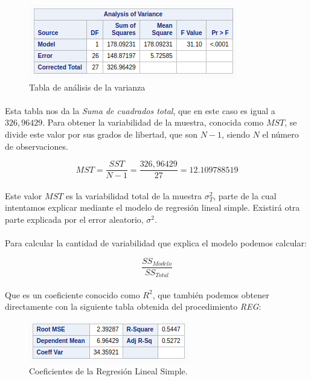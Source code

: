 \documentclass{article}
\begin{document}
  \begin{figure}[H]
    \centering
    \includegraphics[width=.5\linewidth]{img/montgomery/anovatable.png}
    \caption{Tabla de análisis de la varianza}
  \end{figure}

  \paragraph{}
  Esta tabla nos da la \textit{Suma de cuadrados total}, que en este caso es igual a $326,96429$. Para obtener la variabilidad de la muestra, conocida como $MST$, se divide este valor por sus grados de libertad, que son $N-1$, siendo $N$ el número de observaciones.

  \begin{equation}
    MST = \frac{SST}{N-1} = \frac{326,96429}{27} = 12.109788519
  \end{equation}

  \paragraph{}
  Este valor $MST$ es la variabilidad total de la muestra $\sigma_T^2$, parte de la cual intentamos explicar mediante el modelo de regresión lineal simple. Existirá otra parte explicada por el error aleatorio, $\sigma^2$.

  \paragraph{}
  Para calcular la cantidad de variabilidad que explica el modelo podemos calcular:

  \begin{equation}
    \frac{SS_{Modelo}}{SS_{Total}}
  \end{equation}

  \paragraph{}
  Que es un coeficiente conocido como $R^2$, que también podemos obtener directamente con la siguiente tabla obtenida del procedimiento \textit{REG}:

  \begin{figure}[H]
    \centering
    \includegraphics[width=.35\linewidth]{img/montgomery/tablaregaux.png}
    \caption{Coeficientes de la Regresión Lineal Simple.}
    \label{img:mont-tabla-aux}
  \end{figure}
\end{document}
